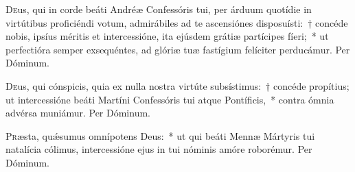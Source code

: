 \documentclass[vesperale_romanum]{subfiles}
\begin{document}
\oratio

\lettrine{D}{e}us, qui in corde beáti Andréæ Confessóris tui, per árduum quotídie in virtútibus proficiéndi votum, admirábiles ad te ascensiónes disposuísti:~† concéde nobis, ipsíus méritis et intercessióne, ita ejúsdem grátiæ partícipes fíeri;~* ut perfectióra semper exsequéntes, ad glóriæ tuæ fastígium felíciter perducámur. Per Dóminum.


\myrule


\duplex




\admagnificat


\oratio

\lettrine{D}{e}us, qui cónspicis, quia ex nulla nostra virtúte subsístimus:~† concéde propítius; ut intercessióne beáti Martíni Confessóris tui atque Pontíficis,~* contra ó\-mnia advérsa muniámur. Per Dóminum.



\oratio

\lettrine{P}{r}æsta, quǽsumus omnípotens Deus:~* ut qui beáti Mennæ Mártyris tui natalícia cólimus, intercessióne ejus in tui nóminis amóre roborémur.
Per Dóminum.



\label{110_7c_nov}
\end{document}
